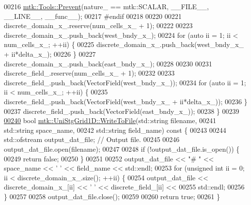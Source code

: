 \begin{DoxyCode}
00216   \hyperlink{classmtk_1_1Tools_a332324c6f25e66be9dff48c5987a3b9f}{mtk::Tools::Prevent}(nature\_ == mtk::SCALAR, \_\_FILE\_\_, \_\_LINE\_\_, \_\_func\_\_);
00217 \textcolor{preprocessor}{  #endif}
00218 
00220 
00221   discrete\_domain\_x\_.reserve(num\_cells\_x\_ + 1);
00222 
00223   discrete\_domain\_x\_.push\_back(west\_bndy\_x\_);
00224   \textcolor{keywordflow}{for} (\textcolor{keyword}{auto} ii = 1; ii < num\_cells\_x\_; ++ii) \{
00225     discrete\_domain\_x\_.push\_back(west\_bndy\_x\_ + ii*delta\_x\_);
00226   \}
00227   discrete\_domain\_x\_.push\_back(east\_bndy\_x\_);
00228 
00230 
00231   discrete\_field\_.reserve(num\_cells\_x\_ + 1);
00232 
00233   discrete\_field\_.push\_back(VectorField(west\_bndy\_x\_));
00234   \textcolor{keywordflow}{for} (\textcolor{keyword}{auto} ii = 1; ii < num\_cells\_x\_; ++ii) \{
00235     discrete\_field\_.push\_back(VectorField(west\_bndy\_x\_ + ii*delta\_x\_));
00236   \}
00237   discrete\_field\_.push\_back(VectorField(east\_bndy\_x\_));
00238 \}
00239 
\hypertarget{mtk__uni__stg__grid__1d_8cc_source_l00240}{}\hyperlink{classmtk_1_1UniStgGrid1D_a6d2c10aa9468a037829f0eb043b898dc}{00240} \textcolor{keywordtype}{bool} \hyperlink{classmtk_1_1UniStgGrid1D_a6d2c10aa9468a037829f0eb043b898dc}{mtk::UniStgGrid1D::WriteToFile}(std::string filename,
00241                                     std::string space\_name,
00242                                     std::string field\_name)\textcolor{keyword}{ const }\{
00243 
00244   std::ofstream output\_dat\_file;  \textcolor{comment}{// Output file.}
00245 
00246   output\_dat\_file.open(filename);
00247 
00248   \textcolor{keywordflow}{if} (!output\_dat\_file.is\_open()) \{
00249     \textcolor{keywordflow}{return} \textcolor{keyword}{false};
00250   \}
00251 
00252   output\_dat\_file << \textcolor{stringliteral}{"# "} << space\_name <<  \textcolor{charliteral}{' '} << field\_name << std::endl;
00253   \textcolor{keywordflow}{for} (\textcolor{keywordtype}{unsigned} \textcolor{keywordtype}{int} ii = 0; ii < discrete\_domain\_x\_.size(); ++ii) \{
00254     output\_dat\_file << discrete\_domain\_x\_[ii] << \textcolor{charliteral}{' '} << discrete\_field\_[ii] <<
00255       std::endl;
00256   \}
00257 
00258   output\_dat\_file.close();
00259 
00260   \textcolor{keywordflow}{return} \textcolor{keyword}{true};
00261 \}
\end{DoxyCode}
